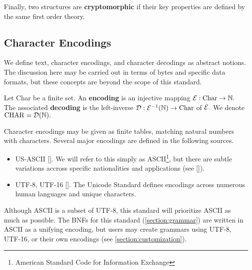 Finally, two structures are \textbf{cryptomorphic} if their key properties are defined by the same first order theory. %

\subsection{Character Encodings}
We define text, character encodings, and character decodings as abstract notions. The discussion here may be carried out in terms of bytes and specific data formats, but these concepts are beyond the scope of this standard.

Let Char be a finite set. An \textbf{encoding} is an injective mapping $\mathcal{E} : \mathrm{Char} \to \mathbb{N}.$ The associated \textbf{decoding} is the left-inverse $\mathcal{D}: \mathcal{E}^{-1}(\mathbb{N}) \to \mathrm{Char}$ of $\mathcal{E}.$ We denote $\mathrm{CHAR} = \mathcal{D}(\mathbb{N}).$

Character encodings may be given as finite tables, matching natural numbers with characters. Several major encodings are defined in the following sources.
\begin{itemize}
	\item US-ASCII []. We will refer to this simply as ASCII\footnote{American Standard Code for Information Exchange}, but there are subtle variations accross specific nationalities and applications (see []).
	\item UTF-8, UTF-16 []. The Unicode Standard defines encodings across numerous human languages and unique characters.  %
\end{itemize}


Although ASCII is a subset of UTF-8, this standard will prioritize ASCII as much as possible. The BNFs for this standard (\ref{section:grammar}) are written in ASCII as a unifying encoding, but users may create grammars using UTF-8, UTF-16, or their own encodings (see \ref{section:customization}).


